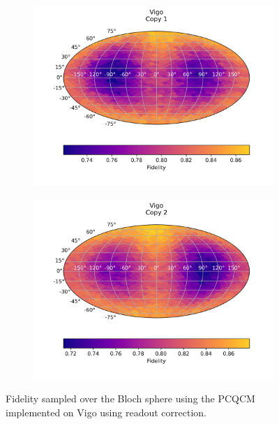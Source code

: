 \begin{figure}[H]
  \centering
  \begin{subfigure}{.5\textwidth}
    \centering
    \includegraphics[width=\textwidth]{Figures/PhaseCovariant/IBM/FullSphere/results_corrected_vigo_copy1.png}
    
    \label{fig:pc_corrected_vigo_sphere_1}
  \end{subfigure}%
  \begin{subfigure}{.5\textwidth}
    \centering
    \includegraphics[width=\textwidth]{Figures/PhaseCovariant/IBM/FullSphere/results_corrected_vigo_copy2.png}
    
    \label{fig:pc_corrected_vigo_sphere_2}
  \end{subfigure}
  \caption{Fidelity sampled over the Bloch sphere using the PCQCM implemented on Vigo using readout correction.}
  \label{fig:pc_corrected_vigo_sphere}
\end{figure}

